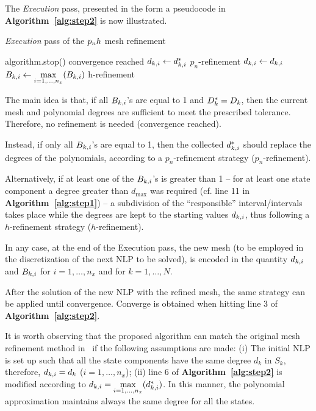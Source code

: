 The \emph{Execution} pass, presented in the form a pseudocode in {\bf Algorithm~\ref{alg:step2}} is now illustrated.
\begin{algorithm}
	\caption{\emph{Execution} pass of the $p_{n}h$ mesh refinement}\label{alg:step2}
	\begin{algorithmic}[1]
			\If {$\Dks = \Dk$}
				\State algorithm.stop() \Comment convergence reached	
			\Else
					\State $d_{k,i} \gets d_{k,i}^{*}$ \Comment ${p_n}$-refinement
				\EndFor
			\EndIf
		\Else
				\State $d_{k,i} \gets d_{k,i}$
				\State $B_{k,i} \gets \max\limits_{i= 1, \dots, n_x}(B_{k,i})$ \Comment h-refinement
			\EndFor		
		\EndIf
	\end{algorithmic}
\end{algorithm}
The main idea is that, if all $B_{k,i}$'s are equal to 1 and $\Dks = \Dk$, then the current mesh and polynomial degrees are sufficient to meet the prescribed tolerance. Therefore, no refinement is needed (convergence reached).

 Instead, if only all $B_{k,i}$'s are equal to 1, then the collected $d_{k,i}^{*}$ should replace the degrees of the polynomials, according to a $p_n$-refinement strategy (${p_n}$-refinement).

Alternatively, if at least one of the $B_{k,i}$'s is greater than 1 -- for at least one state component a degree greater than $d_{\max}$ was required (cf. line 11 in {\bf Algorithm~\ref{alg:step1}}) -- a subdivision of the ``responsible'' interval/intervals takes place while the degrees are kept to the starting values $d_{k,i}$, thus following a $h$-refinement strategy ($h$-refinement).

In any case, at the end of the Execution pass, the new mesh (to be employed in the discretization of the next NLP to be solved), is encoded in the quantity $d_{k,i}$ and $B_{k,i}$ for $i = 1, \dots, n_x$ and for $k = 1, \dots, N$.

After the solution of the new NLP with the refined mesh, the same strategy can be applied until convergence. Converge is obtained when hitting line 3 of {\bf Algorithm~\ref{alg:step2}}.


It is worth observing that the proposed algorithm can match the original mesh refinement method in~\cite{Patterson:OCAM:2015} if the following assumptions are made: (i) The initial NLP is set up such that all the state components have the same degree $d_k$ in $S_k$, therefore, $d_{k,i} = d_k$ ($i = 1, \dots, n_x$); (ii) line 6 of {\bf Algorithm~\ref{alg:step2}} is modified according to $d_{k,i} = \max\limits_{i= 1, \dots, n_x}(d_{k,i}^{*})$. In this manner, the polynomial approximation maintains always the same degree for all the states.



